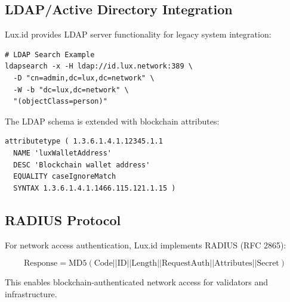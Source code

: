 \subsection{LDAP/Active Directory Integration}

Lux.id provides LDAP server functionality for legacy system integration:

\begin{lstlisting}
# LDAP Search Example
ldapsearch -x -H ldap://id.lux.network:389 \
  -D "cn=admin,dc=lux,dc=network" \
  -W -b "dc=lux,dc=network" \
  "(objectClass=person)"
\end{lstlisting}

The LDAP schema is extended with blockchain attributes:

\begin{lstlisting}
attributetype ( 1.3.6.1.4.1.12345.1.1
  NAME 'luxWalletAddress'
  DESC 'Blockchain wallet address'
  EQUALITY caseIgnoreMatch
  SYNTAX 1.3.6.1.4.1.1466.115.121.1.15 )
\end{lstlisting}

\subsection{RADIUS Protocol}

For network access authentication, Lux.id implements RADIUS (RFC 2865):

\begin{equation}
    \text{Response} = \text{MD5}(\text{Code} || \text{ID} || \text{Length} || \text{RequestAuth} || \text{Attributes} || \text{Secret})
\end{equation}

This enables blockchain-authenticated network access for validators and infrastructure.

